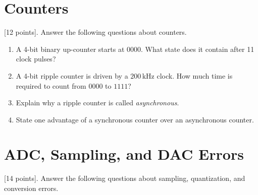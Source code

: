 \documentclass[10pt]{article}
\begin{document}
\section{Counters}

[12 points]. Answer the following questions about counters.

\begin{enumerate}
\item A 4-bit binary up-counter starts at $0000$. What state does it contain after 11 clock pulses? \\ \vspace{0.5cm}
\item A 4-bit ripple counter is driven by a $200\,\mathrm{kHz}$ clock. How much time is required to count from $0000$ to $1111$? \\ \vspace{1.0cm}
\item Explain why a ripple counter is called \emph{asynchronous}. \\ \vspace{1.0cm}
\item State one advantage of a synchronous counter over an asynchronous counter. \\ \vspace{1.0cm}
\end{enumerate}

\section{ADC, Sampling, and DAC Errors}

[14 points]. Answer the following questions about sampling, quantization, and conversion errors.
\end{document}
